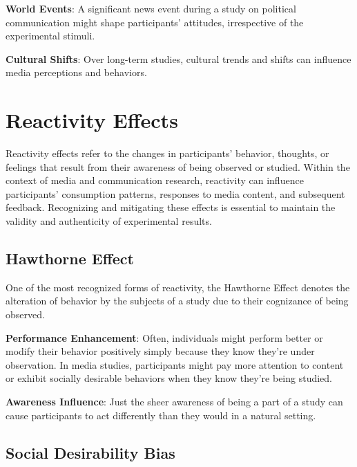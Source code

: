 \documentclass[
  b5paper]{book}
\begin{document}
\textbf{World Events}: A significant news event during a study on political communication might shape participants' attitudes, irrespective of the experimental stimuli.

\textbf{Cultural Shifts}: Over long-term studies, cultural trends and shifts can influence media perceptions and behaviors.

\hypertarget{reactivity-effects}{%
\section{Reactivity Effects}\label{reactivity-effects}}

Reactivity effects refer to the changes in participants' behavior, thoughts, or feelings that result from their awareness of being observed or studied. Within the context of media and communication research, reactivity can influence participants' consumption patterns, responses to media content, and subsequent feedback. Recognizing and mitigating these effects is essential to maintain the validity and authenticity of experimental results.

\hypertarget{hawthorne-effect}{%
\subsection*{Hawthorne Effect}\label{hawthorne-effect}}

One of the most recognized forms of reactivity, the Hawthorne Effect denotes the alteration of behavior by the subjects of a study due to their cognizance of being observed.

\textbf{Performance Enhancement}: Often, individuals might perform better or modify their behavior positively simply because they know they're under observation. In media studies, participants might pay more attention to content or exhibit socially desirable behaviors when they know they're being studied.

\textbf{Awareness Influence}: Just the sheer awareness of being a part of a study can cause participants to act differently than they would in a natural setting.

\hypertarget{social-desirability-bias}{%
\subsection*{Social Desirability Bias}\label{social-desirability-bias}}
\end{document}
